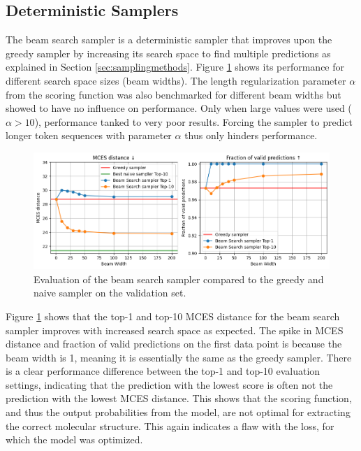 \subsection{Deterministic Samplers}

The beam search sampler is a deterministic sampler that improves upon the greedy sampler by increasing its search space to find multiple predictions as explained in Section \ref{sec:samplingmethods}.
Figure \ref{fig:beam-search} shows its performance for different search space sizes (beam widths).
The length regularization parameter $\alpha$ from the scoring function was also benchmarked for different beam widths but showed to have no influence on performance.
Only when large values were used ($\alpha > 10$), performance tanked to very poor results.
Forcing the sampler to predict longer token sequences with parameter $\alpha$ thus only hinders performance.

\begin{figure}[h]
    \centering
    \includegraphics[width=1.0\textwidth]{figures/results/samplers/beam_search.png}
    \caption{Evaluation of the beam search sampler compared to the greedy and naive sampler on the validation set.}
    \label{fig:beam-search}
\end{figure}

Figure \ref{fig:beam-search} shows that the top-1 and top-10 MCES distance for the beam search sampler improves with increased search space as expected.
The spike in MCES distance and fraction of valid predictions on the first data point is because the beam width is 1, meaning it is essentially the same as the greedy sampler.
There is a clear performance difference between the top-1 and top-10 evaluation settings, indicating that the prediction with the lowest score is often not the prediction with the lowest MCES distance.
This shows that the scoring function, and thus the output probabilities from the model, are not optimal for extracting the correct molecular structure.
This again indicates a flaw with the loss, for which the model was optimized.


